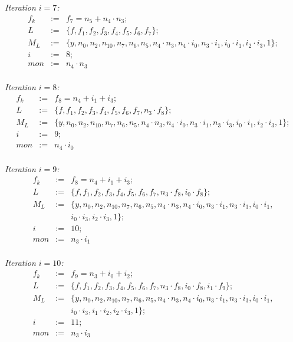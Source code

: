 \begin{Example}
	{\it Iteration $i=7$:}
	\begin{eqnarray}
		f_{k}&:=&f_{7}=n_5+n_4\cdot n_3; \nonumber \\
		L&:=&\{ f,f_1,f_{2},f_{3},f_{4},f_{5},f_{6},f_{7}\}; \nonumber \\
		M_{L}&:=&\{ y,n_0,n_2,n_{10},n_7,n_6,n_5,n_4\cdot n_3,n_4\cdot i_0,n_3\cdot i_1,i_0\cdot i_1,i_2\cdot i_3,1 \}; \nonumber \\
		i&:=&8;  \nonumber \\
		mon&:=& n_4\cdot n_3 \nonumber 
	\end{eqnarray}\\
	
	{\it Iteration $i=8$:}
	\begin{eqnarray}
		f_{k}&:=&f_{8}=n_4+i_1+i_3; \nonumber \\
		L&:=&\{ f,f_1,f_{2},f_{3},f_{4},f_{5},f_{6},f_{7},n_3 \cdot f_{8}\}; \nonumber \\
		M_{L}&:=&\{ y,n_0,n_2,n_{10},n_7,n_6,n_5,n_4\cdot n_3,n_4\cdot i_0,n_3\cdot i_1,n_3\cdot i_3,i_0\cdot i_1,i_2\cdot i_3,1 \}; \nonumber \\
		i&:=&9;  \nonumber \\
		mon&:=& n_4\cdot i_0\nonumber 
	\end{eqnarray}\\
	
	{\it Iteration $i=9$:}
	\begin{eqnarray}
		f_{k}&:=&f_{8}=n_4+i_1+i_3; \nonumber \\
		L&:=&\{ f,f_1,f_{2},f_{3},f_{4},f_{5},f_{6},f_{7},n_3 \cdot f_8, i_0 \cdot f_8\}; \nonumber \\
		M_{L}&:=&\{ y,n_0,n_2,n_{10},n_7,n_6,n_5,n_4\cdot n_3,n_4\cdot i_0,n_3\cdot i_1,n_3\cdot i_3,i_0\cdot i_1,\nonumber \\
		&{}&i_0\cdot i_3, i_2\cdot i_3,1\}; \nonumber \\
		i&:=&10;  \nonumber \\
		mon&:=& n_3\cdot i_1\nonumber 
	\end{eqnarray}\\
	
	{\it Iteration $i=10$:}
	\begin{eqnarray}
		f_{k}&:=&f_{9}=n_3+i_0+i_2; \nonumber \\
		L&:=&\{ f,f_1,f_{2},f_{3},f_{4},f_{5},f_{6},f_{7},n_3 \cdot f_{8}, i_{0} \cdot f_8,i_1 \cdot f_{9} \}; \nonumber \\
		M_{L}&:=&\{ y,n_0,n_2,n_{10},n_7,n_6,n_5,n_4\cdot n_3,n_4\cdot i_0,n_3\cdot i_1,n_3\cdot i_3,i_0\cdot i_1,  \nonumber \\
		&{}&i_0\cdot i_3, i_1\cdot i_2,i_2\cdot i_3,1\}; \nonumber \\
		i&:=&11;  \nonumber \\
		mon&:=& n_3\cdot i_3\nonumber 
	\end{eqnarray}\\
	

\end{Example}
